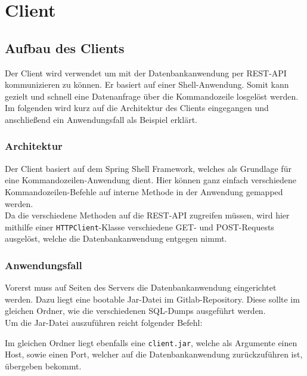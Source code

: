 \chapter{Client}
\label{Client}


\section{Aufbau des Clients}

Der Client wird verwendet um mit der Datenbankanwendung per REST-API kommunizieren zu können. Er basiert auf einer Shell-Anwendung. Somit kann gezielt und schnell eine Datenanfrage über die Kommandozeile losgelöst werden.
Im folgenden wird kurz auf die Architektur des Clients eingegangen und anschließend ein Anwendungsfall als Beispiel erklärt.

\subsection{Architektur}

Der Client basiert auf dem Spring Shell Framework, welches als Grundlage für eine Kommandozeilen-Anwendung dient. \cite{Spring:SpringShell}
Hier können ganz einfach verschiedene Kommandozeilen-Befehle auf interne Methode in der Anwendung gemapped werden.\\

Da die verschiedene Methoden auf die REST-API zugreifen müssen, wird hier mithilfe einer \texttt{HTTPClient}-Klasse verschiedene GET- und POST-Requests ausgelöst, welche die Datenbankanwendung entgegen nimmt.


\subsection{Anwendungsfall}

Vorerst muss auf Seiten des Servers die Datenbankanwendung eingerichtet werden. Dazu liegt eine bootable Jar-Datei im Gitlab-Repository. Diese sollte im gleichen Ordner, wie die verschiedenen SQL-Dumps ausgeführt werden.\\
Um die Jar-Datei auszuführen reicht folgender Befehl:

\begin{center}
\end{center}

Im gleichen Ordner liegt ebenfalls eine \texttt{client.jar}, welche als Argumente einen Host, sowie einen Port, welcher auf die Datenbankanwendung zurückzuführen ist, übergeben bekommt.

